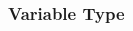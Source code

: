 \documentclass[en, 11pt, xcolor=dvipsnames]{beamer}
\begin{document}
\begin{frame}[fragile]
	\frametitle{Variable Type}
	\begin{columns}[c]
		\begin{column}{0.9\textwidth}


\end{column}
\end{columns}
\end{frame}
\end{document}
